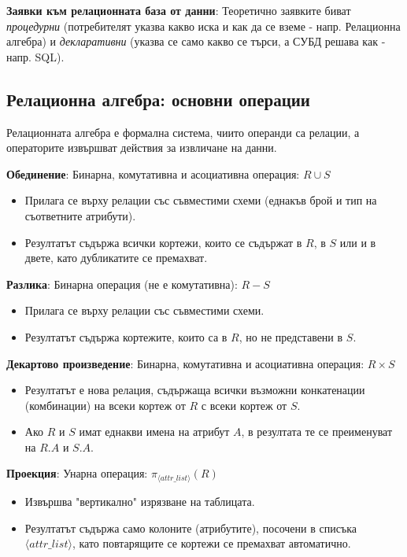 \documentclass{article}
\renewcommand{\\}{\newline}
\begin{document}
\textbf{Заявки към релационната база от данни}: Теоретично заявките биват \textit{процедурни} (потребителят указва какво иска и как да се вземе - напр. Релационна алгебра) и \textit{декларативни} (указва се само какво се търси, а СУБД решава как - напр. SQL).

\subsection{Релационна алгебра: основни операции}

Релационната алгебра е формална система, чиито операнди са релации, а операторите извършват действия за извличане на данни.

\textbf{Обединение}: Бинарна, комутативна и асоциативна операция: $R \cup S$ 
\begin{itemize}
    \item Прилага се върху релации със съвместими схеми (еднакъв брой и тип на съответните атрибути).
    \item Резултатът съдържа всички кортежи, които се съдържат в $R$, в $S$ или и в двете, като дубликатите се премахват.
\end{itemize}

\textbf{Разлика}: Бинарна операция (не е комутативна): $R - S$ 
\begin{itemize}
    \item Прилага се върху релации със съвместими схеми.
    \item Резултатът съдържа кортежите, които са в $R$, но не представени в $S$.
\end{itemize}

\textbf{Декартово произведение}: Бинарна, комутативна и асоциативна операция: $R \times S$ 
\begin{itemize}
  \item Резултатът е нова релация, съдържаща всички възможни конкатенации (комбинации) на всеки кортеж от $R$ с всеки кортеж от $S$.
  \item Ако $R$ и $S$ имат еднакви имена на атрибут $A$, в резултата те се преименуват на $R.A$ и $S.A$.
\end{itemize}

\textbf{Проекция}: Унарна операция: $\pi_{\langle attr\_list\rangle}(R)$ 
\begin{itemize}
    \item Извършва "вертикално" изрязване на таблицата.
    \item Резултатът съдържа само колоните (атрибутите), посочени в списъка $\langle attr\_list\rangle$, като повтарящите се кортежи се премахват автоматично.
\end{itemize}
\end{document}
